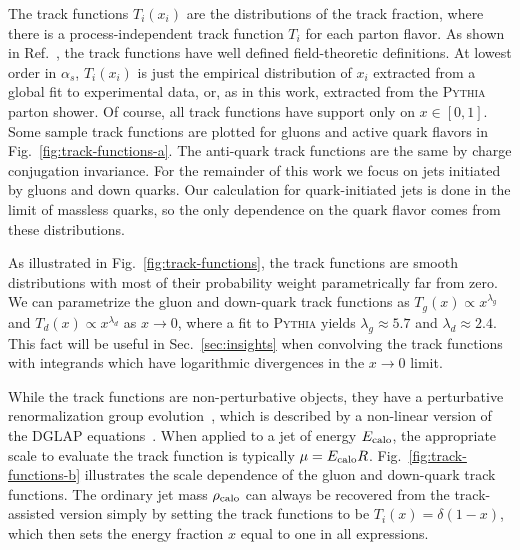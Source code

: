 \documentclass[letterpaper,11pt]{article}
\newcommand{\Ref}[1]{Ref.~\cite{#1}}
\newcommand{\Fig}[1]{Fig.~\ref{#1}}
\newcommand{\Sec}[1]{Sec.~\ref{#1}}
\begin{document}
The track functions $T_i(x_i)$ are the distributions of the track fraction, where there is a process-independent track function $T_i$ for each parton flavor. 
%
As shown in \Ref{Chang:2013iba}, the track functions have well defined field-theoretic definitions.
%
At lowest order in $\alpha_s$, $T_i(x_i)$ is just the empirical distribution of $x_i$ extracted from a global fit to experimental data, or, as in this work, extracted from the \textsc{Pythia} parton shower.
%
Of course, all track functions have support only on $x \in [0,1]$.  
%
Some sample track functions are plotted for gluons and active quark flavors in \Fig{fig:track-functions-a}. 
%
The anti-quark track functions are the same by charge conjugation invariance. 
%
For the remainder of this work we focus on jets initiated by gluons and down quarks. 
%
Our calculation for quark-initiated jets is done in the limit of massless quarks, so the only dependence on the quark flavor comes from these distributions. 


As illustrated in \Fig{fig:track-functions}, the track functions are smooth distributions with most of their probability weight parametrically far from zero.
%
We can parametrize the gluon and down-quark track functions as $T_g(x) \propto x^{\lambda_g}$ and $T_d(x) \propto x^{\lambda_d}$ as $x \rightarrow 0$, where a fit to \textsc{Pythia} yields $\lambda_g \approx 5.7$ and $\lambda_d \approx 2.4$.
%
This fact will be useful in \Sec{sec:insights} when convolving the track functions with integrands which have logarithmic divergences in the $x\rightarrow 0$ limit. 


While the track functions are non-perturbative objects, they have a perturbative renormalization group evolution~\cite{Chang:2013iba,Elder:2017bkd}, which is described by a non-linear version of the DGLAP equations~\cite{Gribov:1972ri,Lipatov:1974qm,Dokshitzer:1977sg,Altarelli:1977zs}. 
%
When applied to a jet of energy $E_{\rm calo}$, the appropriate scale to evaluate the track function is typically $\mu = E_{\rm calo} R$. 
%
\Fig{fig:track-functions-b} illustrates the scale dependence of the gluon and down-quark track functions.
%
The ordinary jet mass $\rho_{\rm calo}$ can always be recovered from the track-assisted version simply by setting the track functions to be $T_i(x) = \delta(1-x)$, which then sets the energy fraction $x$ equal to one in all expressions. 
\end{document}
